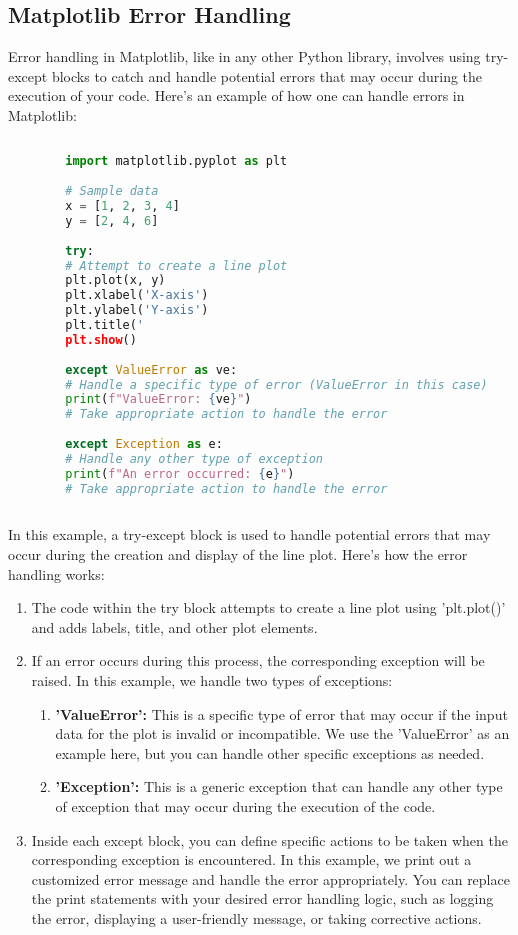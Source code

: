 \subsection{Matplotlib Error Handling}

Error handling in Matplotlib, like in any other Python library, involves using try-except blocks to catch and handle potential errors that may occur during the execution of your code. Here's an example of how one can handle errors in Matplotlib:

	\begin{lstlisting}[language=Python]
	
		import matplotlib.pyplot as plt
		
		# Sample data
		x = [1, 2, 3, 4]
		y = [2, 4, 6]
		
		try:
		# Attempt to create a line plot
		plt.plot(x, y)
		plt.xlabel('X-axis')
		plt.ylabel('Y-axis')
		plt.title('
		plt.show()
		
		except ValueError as ve:
		# Handle a specific type of error (ValueError in this case)
		print(f"ValueError: {ve}")
		# Take appropriate action to handle the error
		
		except Exception as e:
		# Handle any other type of exception
		print(f"An error occurred: {e}")
		# Take appropriate action to handle the error
			
	\end{lstlisting}

In this example, a try-except block is used to handle potential errors that may occur during the creation and display of the line plot. Here's how the error handling works:

\begin{enumerate}
	\item The code within the try block attempts to create a line plot using 'plt.plot()' and adds labels, title, and other plot elements.
	
	\item If an error occurs during this process, the corresponding exception will be raised. In this example, we handle two types of exceptions:
		\begin{enumerate}
			\item \textbf{'ValueError':} This is a specific type of error that may occur if the input data for the plot is invalid or incompatible. We use the 'ValueError' as an example here, but you can handle other specific exceptions as needed.
			\item \textbf{'Exception':} This is a generic exception that can handle any other type of exception that may occur during the execution of the code.
		\end{enumerate}
	
	\item Inside each except block, you can define specific actions to be taken when the corresponding exception is encountered. In this example, we print out a customized error message and handle the error appropriately. You can replace the print statements with your desired error handling logic, such as logging the error, displaying a user-friendly message, or taking corrective actions.
	
\end{enumerate}


